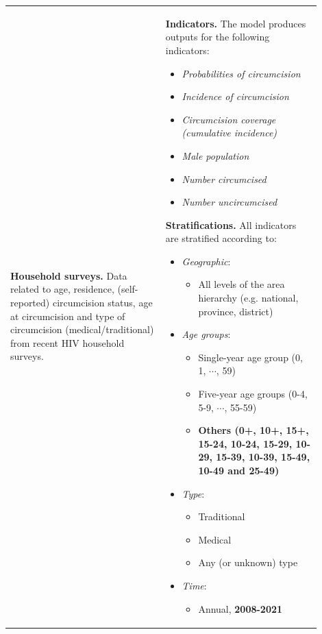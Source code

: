 \documentclass{article}
\begin{document}
\begin{appendix}
{\begin{table}[H]
\begin{tabular}{| p{0.45\linewidth} | p{0.45\linewidth} |}
			{\bf Household surveys.} Data related to age, residence, (self-reported) circumcision status, age at circumcision and type of circumcision (medical/traditional) from recent HIV household surveys. 
			
		& 
			{\bf Indicators.}  The model produces outputs for the following indicators:
			\begin{itemize}
				\item {\it Probabilities of circumcision}
                \item {\it Incidence of circumcision}
				\item {\it Circumcision coverage (cumulative incidence)}
				\item {\it Male population}
				\item {\it Number circumcised}
				\item {\it Number uncircumcised}
			\end{itemize}
			\vspace{5pt}
			{\bf Stratifications.} All indicators are stratified according to: 
			\begin{itemize}
				\item {\it Geographic}: 
				\begin{itemize}
					\item All levels of the area hierarchy (e.g. national, province, district)
				\end{itemize}
				\item {\it Age groups}: 
				\begin{itemize}
					\item Single-year age group (0, 1, $\cdots$, 59)
					\item Five-year age groups (0-4, 5-9, $\cdots$, 55-59)
					\item {\color{red}\bf Others (0+, 10+, 15+, 15-24, 10-24, 15-29, 10-29, 15-39, 10-39, 15-49, 10-49 and 25-49)}
				\end{itemize}
				\item {\it Type}: 
				\begin{itemize}
					\item Traditional
					\item Medical 
					\item Any (or unknown) type 
				\end{itemize}
				\item {\it Time}: 
				\begin{itemize}
					\item Annual, {\color{red}\bf 2008-2021}
				\end{itemize}

\end{itemize}
\end{tabular}
\end{table}}
\end{appendix}
\end{document}
